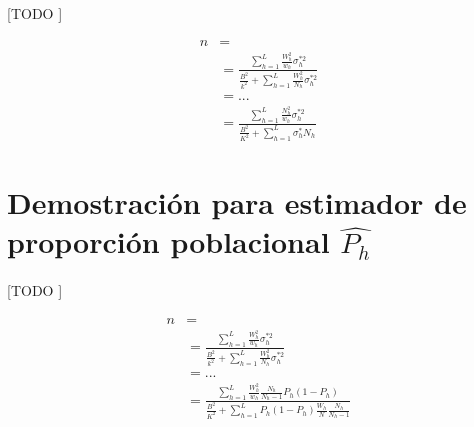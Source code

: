 \documentclass{article}
\begin{document}
    \paragraph{}
    [TODO ]

    \begin{align}
      n &= \\
      &= \frac{\sum\limits_{h=1}^L\frac{W_h^2}{w_h}\sigma_h^{*2}}{\frac{B^2}{k^2}+\sum\limits_{h=1}^L\frac{W_h^2}{N_h}\sigma_h^{*2}} \\
      &= ... \\
      &= \frac{\sum\limits_{h=1}^{L} \frac{N_h^2}{w_h}\sigma_h^{*2}}
              {\frac{B^2}{K^2}+\sum\limits_{h=1}^{L}\sigma_h^* N_h}
    \end{align}

  \section{Demostración para estimador de proporción poblacional $\widehat{P_h}$}
  \label{sec:dem2}

    \paragraph{}
    [TODO ]

    \begin{align}
      n &= \\
      &= \frac{\sum\limits_{h=1}^L\frac{W_h^2}{w_h}\sigma_h^{*2}}{\frac{B^2}{k^2}+\sum\limits_{h=1}^L\frac{W_h^2}{N_h}\sigma_h^{*2}} \\
      &= ... \\
      &= \frac{\sum\limits_{h=1}^L \frac{W_h^2}{w_h}\frac{N_h}{N_h-1}P_h(1-P_h)}
              {\frac{B^2}{K^2} + \sum\limits_{h=1}^LP_h(1-P_h)\frac{W_h}{N}\frac{N_h}{N_h-1}}
    \end{align}




  \nocite{muest2017}
  \nocite{sarndal2003model}

  
  
\end{document}
